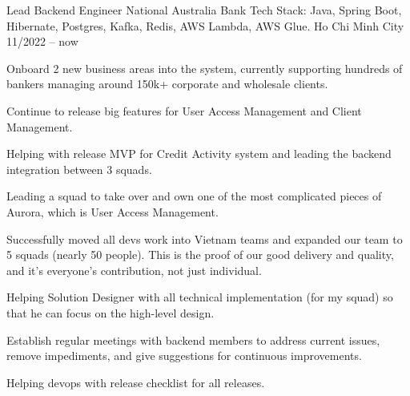 

\begin{cventries}

   

    
    \cventry
    {Lead Backend Engineer} %
    {National Australia Bank
        \newline
         \fontsize{9}{18}\selectfont \textnormal {Tech Stack: Java, Spring Boot, Hibernate, Postgres, Kafka, Redis, AWS Lambda, AWS Glue.}
    } %
    {Ho Chi Minh City} %
    {11/2022 -- now} %
    {
        \begin{cvitems} %
            \item{Onboard 2 new business areas into the system, currently supporting hundreds of bankers managing around 150k+ corporate and wholesale clients.}
            \item{Continue to release big features for User Access Management and Client Management.}
            \item{Helping with release MVP for Credit Activity system and leading the backend integration between 3 squads.}
            \item {Leading a squad to take over and own one of the most complicated pieces of Aurora, which is User Access Management.}
            \item {Successfully moved all devs work into Vietnam teams and expanded our team to 5 squads (nearly 50 people). This is the proof of our good delivery and quality, and it's everyone's contribution, not just individual.}
            \item {Helping Solution Designer with all technical implementation (for my squad) so that he can focus on the high-level design.}
            \item {Establish regular meetings with backend members to address current issues, remove impediments, and give suggestions for continuous improvements.}
            \item {Helping devops with release checklist for all releases.}

\end{cvitems}}
\end{cventries}
